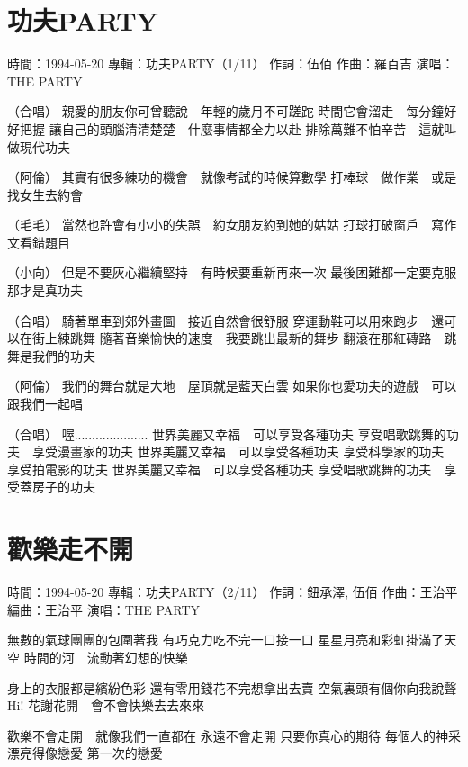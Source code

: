 \documentclass[UTF8,a4paper,oneside,twocolumn,12pt]{ctexbook}
\newcommand{\infopair}[2]{\textbullet #1：#2}
\newcommand{\zc}[1][伍佰]{\infopair{作詞}{#1}}
\newcommand{\zq}[1][伍佰]{\infopair{作曲}{#1}}
\newcommand{\bq}[1][伍佰]{\infopair{編曲}{#1}}
\newcommand{\zj}[1]{\infopair{專輯}{#1}}
\newcommand{\sj}[1]{\infopair{時間}{#1}}
\newenvironment{info}{\begin{flushleft}\kaishu
	}
	{\end{flushleft}\normalsize\yahei\par}
\newenvironment{lyric}{
	}
{}
\begin{document}
\section{功夫PARTY}
\begin{info}
	\sj{1994-05-20}
	\zj{功夫PARTY（1/11）}
	\zc
	\zq[羅百吉]
	\infopair{演唱}{THE PARTY}
\end{info}
\begin{lyric}
	（合唱）
	親愛的朋友你可曾聽說　年輕的歲月不可蹉跎
	時間它會溜走　每分鐘好好把握
	讓自己的頭腦清清楚楚　什麼事情都全力以赴
	排除萬難不怕辛苦　這就叫做現代功夫

	（阿倫）
	其實有很多練功的機會　就像考試的時候算數學
	打棒球　做作業　或是找女生去約會

	（毛毛）
	當然也許會有小小的失誤　約女朋友約到她的姑姑
	打球打破窗戶　寫作文看錯題目

	（小向）
	但是不要灰心繼續堅持　有時候要重新再來一次
	最後困難都一定要克服　那才是真功夫

	（合唱）
	騎著單車到郊外畫圖　接近自然會很舒服
	穿運動鞋可以用來跑步　還可以在街上練跳舞
	隨著音樂愉快的速度　我要跳出最新的舞步
	翻滾在那紅磚路　跳舞是我們的功夫

	（阿倫）
	我們的舞台就是大地　屋頂就是藍天白雲
	如果你也愛功夫的遊戲　可以跟我們一起唱

	（合唱）
	喔.....................
	世界美麗又幸福　可以享受各種功夫
	享受唱歌跳舞的功夫　享受漫畫家的功夫
	世界美麗又幸福　可以享受各種功夫
	享受科學家的功夫　享受拍電影的功夫
	世界美麗又幸福　可以享受各種功夫
	享受唱歌跳舞的功夫　享受蓋房子的功夫
\end{lyric}

\section{歡樂走不開}
\begin{info}
	\sj{1994-05-20}
	\zj{功夫PARTY（2/11）}
	\zc[鈕承澤, 伍佰]
	\zq[王治平]
	\bq[王治平]
	\infopair{演唱}{THE PARTY}
\end{info}
\begin{lyric}
	無數的氣球團團的包圍著我
	有巧克力吃不完一口接一口
	星星月亮和彩虹掛滿了天空
	時間的河　流動著幻想的快樂

	身上的衣服都是繽紛色彩
	還有零用錢花不完想拿出去賣
	空氣裏頭有個你向我說聲Hi!
	花謝花開　會不會快樂去去來來

	歡樂不會走開　就像我們一直都在
	永遠不會走開 只要你真心的期待
	每個人的神采 漂亮得像戀愛 第一次的戀愛
\end{lyric}
\end{document}
